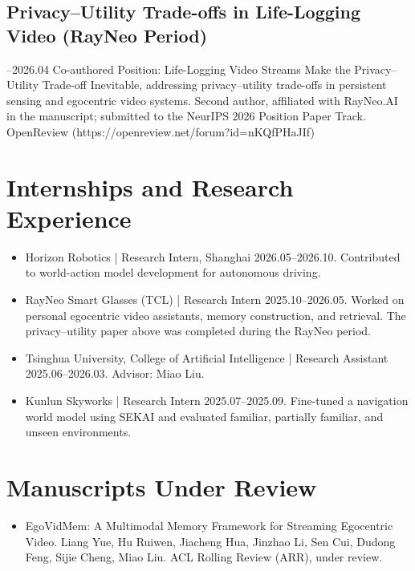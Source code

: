 \documentclass[a4paper,10pt]{article}
\begin{document}
\subsection*{Privacy–Utility Trade-offs in Life-Logging Video (RayNeo Period)}
\par{}–2026.04
Co-authored Position: Life-Logging Video Streams Make the Privacy–Utility Trade-off Inevitable, addressing privacy–utility trade-offs in persistent sensing and egocentric video systems. Second author, affiliated with RayNeo.AI in the manuscript; submitted to the NeurIPS 2026 Position Paper Track.
OpenReview (https://openreview.net/forum?id=nKQfPHaJIf)
\par\smallskip
\section*{Internships and Research Experience}
\par\smallskip
\begin{itemize}
\item Horizon Robotics | Research Intern, Shanghai 2026.05–2026.10. Contributed to world-action model development for autonomous driving.
\item RayNeo Smart Glasses (TCL) | Research Intern 2025.10–2026.05. Worked on personal egocentric video assistants, memory construction, and retrieval. The privacy–utility paper above was completed during the RayNeo period.
\item Tsinghua University, College of Artificial Intelligence | Research Assistant 2025.06–2026.03. Advisor: Miao Liu.
\item Kunlun Skyworks | Research Intern 2025.07–2025.09. Fine-tuned a navigation world model using SEKAI and evaluated familiar, partially familiar, and unseen environments.
\end{itemize}
\par\smallskip
\section*{Manuscripts Under Review}
\begin{itemize}
\item EgoVidMem: A Multimodal Memory Framework for Streaming Egocentric Video. Liang Yue, Hu Ruiwen, Jiacheng Hua, Jinzhao Li, Sen Cui, Dudong Feng, Sijie Cheng, Miao Liu. ACL Rolling Review (ARR), under review.
\end{itemize}
\end{document}
